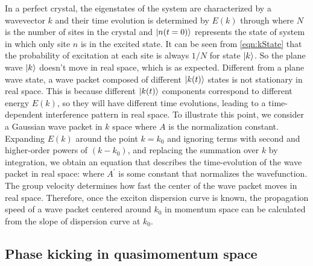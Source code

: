 In a perfect crystal, the eigenstates of the system are characterized by a wavevector $k$ and their time evolution is 
determined by $E(k)$ through
where $N$ is the number of sites in the crystal and $| n(t=0) \rangle$ represents the state of system in which only site
$n$ is in the excited state. It can be seen from \autoref{eqn:kState} that the probability of excitation at each site is always $1/N$ for 
state $| k \rangle$. So the plane wave $| k \rangle$ doesn't move in real space, which is as expected. Different from a plane
 wave state, a wave packet composed of different $| k(t) \rangle$ states is not stationary in real space. This is because
 different $| k(t) \rangle$ components correspond to different energy $E(k)$, so they will have different time evolutions, 
 leading to a 
time-dependent interference pattern in real space. To illustrate this point, we consider a Gaussian wave packet in $k$
space 
where $A$ is the normalization constant. 
Expanding $E(k)$ around the point $k=k_0$ and ignoring terms with second and higher-order powers of $(k-k_0)$, and replacing the
 summation over $k$ by integration, we obtain an equation that describes the time-evolution of the wave packet in 
real space:
where $A^{'}$ is some constant that normalizes the wavefunction. The group velocity
determines how fast the center of the wave packet moves in real space. Therefore, once the exciton dispersion curve is known, the propagation speed of a wave packet centered around $k_0$ in momentum space can be calculated from the slope of dispersion curve at $k_0$.

\subsection{Phase kicking in quasimomentum space}

